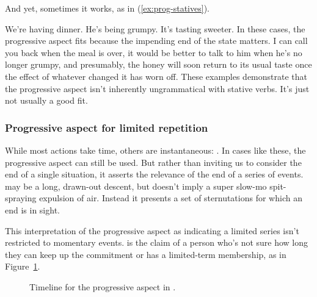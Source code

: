 And yet, sometimes it works, as in (\ref{ex:prog-statives}).

\ea\label{ex:prog-statives}
\ea We're having dinner.
\ex He's being grumpy.
\ex It's tasting sweeter.
\z\z
In these cases, the progressive aspect fits because the impending end of the state matters. I can call you back when the meal is over, it would be better to talk to him when he's no longer grumpy, and presumably, the honey will soon return to its usual taste once the effect of whatever changed it has worn off. These examples demonstrate that the progressive aspect isn't inherently ungrammatical with stative verbs. It's just not usually a good fit.

\subsubsection{Progressive aspect for limited repetition}
While most actions take time, others are instantaneous: . In cases like these, the progressive aspect can still be used. But rather than inviting us to consider the end of a single situation, it asserts the relevance of the end of a series of events.  may be a long, drawn-out descent, but  doesn't imply a super slow-mo spit-spraying expulsion of air. Instead it presents a set of sternutations for which an end is in sight.

This interpretation of the progressive aspect as indicating a limited series isn't restricted to momentary events.  is the claim of a person who's not sure how long they can keep up the commitment or has a limited-term membership, as in Figure~\ref{fig:regular-gym-visits}.

\begin{figure}
    \caption{Timeline for the progressive aspect in .}
    \label{fig:regular-gym-visits}
\end{figure}

